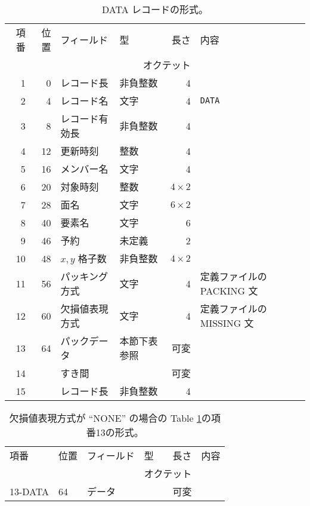 \begin{table}[htp]
 \begin{center}
 \begin{tabular}{rr|llrl}
 \hline
 項番 & 位置 & フィールド & 型 & 長さ & 内容 \\
      &      &            & \multicolumn{2}{r}{オクテット} &  \\
 \hline
 1 & 0 & レコード長 & 非負整数 & 4 & \\
 2 & 4 & レコード名 & 文字 & 4 & {\tt DATA} \\
 3 & 8 & レコード有効長 & 非負整数 & 4 & \\
 4 & 12 & 更新時刻 & 整数 & 4 & \\
 \hline
 5 & 16 & メンバー名	& 文字 & 4 & \\
 6 & 20 & 対象時刻	& 整数 & \(4\times 2\) & \\
 7 & 28 & 面名		& 文字 & \(6\times 2\) & \\
 8 & 40 & 要素名	& 文字 & 6 & \\
 9 & 46 & 予約		& 未定義 & 2 & \\
 10 & 48 & \(x, y\) 格子数 & 非負整数 & \(4\times 2\) & \\
 11 & 56 & パッキング方式 & 文字 & 4 & 定義ファイルの PACKING 文 \\
 12 & 60 & 欠損値表現方式 & 文字 & 4 & 定義ファイルの MISSING 文 \\
 \hline
 13 & 64 & パックデータ & 本節下表参照 & 可変 & \\
 \hline
 14 &  & すき間 & & 可変 &  \\
 15 &  & レコード長 & 非負整数 & 4 &  \\
 \hline
 \end{tabular}
 \end{center}
 \caption[DATA レコードの形式]{%
  DATA レコードの形式。
 }
 \label{table.fmt.data}
\end{table}

\begin{table}[htp]
 \begin{center}
 \begin{tabular}{ll|llrl}
 \hline
 項番 & 位置 & フィールド & 型 & 長さ & 内容 \\
      &      &            & \multicolumn{2}{r}{オクテット} &  \\
 \hline
 13-DATA &  64  & データ &   & 可変 & \\ \hline
 \end{tabular}
 \end{center}
 \caption[DATA レコードの項番13の形式]{%
  欠損値表現方式が ``NONE'' の場合の
 Table \ref{table.fmt.data}の項番13の形式。
 }
 \label{table.fmt.data.none}
\end{table}

